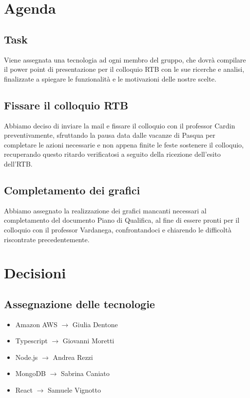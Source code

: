 \documentclass{article}
\begin{document}
\section{Agenda}
\subsection{Task}
Viene assegnata una tecnologia ad ogni membro del gruppo, che dovrà compilare il power point di presentazione per il colloquio RTB con le sue ricerche e analisi, finalizzate a spiegare le funzionalità e le motivazioni delle nostre scelte. 
\subsection{Fissare il colloquio RTB}
Abbiamo deciso di inviare la mail e fissare il colloquio con il professor Cardin preventivamente, sfruttando la pausa data dalle vacanze di Pasqua per completare le azioni necessarie e non appena finite le feste sostenere il colloquio, recuperando questo ritardo verificatosi a seguito della ricezione dell'esito dell'RTB.
\subsection{Completamento dei grafici}
Abbiamo assegnato la realizzazione dei grafici mancanti necessari al completamento del documento Piano di Qualifica, al fine di essere pronti per il colloquio con il professor Vardanega, confrontandoci e chiarendo le difficoltà riscontrate precedentemente. 
\section{Decisioni}
\subsection{Assegnazione delle tecnologie}
\begin{itemize}[label={}, noitemsep]
    \item Amazon AWS $\rightarrow$ Giulia Dentone
    \item Typescript $\rightarrow$ Giovanni Moretti
    \item Node.js $\rightarrow$ Andrea Rezzi
    \item MongoDB $\rightarrow$ Sabrina Caniato
    \item React $\rightarrow$ Samuele Vignotto
\end{itemize}
\end{document}
